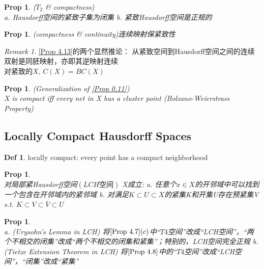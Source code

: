 \documentclass[hidelinks]{article}
\theoremstyle{definition}
\newtheorem*{defin}{Def}
\theoremstyle{plain}
\newtheorem{proposition}[theorem]{Prop}
\theoremstyle{remark}
\newtheorem*{remark}{Remark}
\begin{document}
\begin{proposition}($T_2$ \& compactness)~\\
a. Hausdorff空间的紧致子集为闭集\newline
b. 紧致Hausdorff空间是正规的
\end{proposition}

\begin{proposition}(compactness \& continuity)\label{Prop 4.13}
连续映射保紧致性
\end{proposition}

\begin{remark}
\autoref{Prop 4.13}的两个显然推论：\newline
\indent 从紧致空间到Hausdorff空间之间的连续双射是同胚映射，亦即其逆映射连续 \\
\indent 对紧致的$X$, $C(X)=BC(X)$
\end{remark}

\begin{proposition} (Generalization of \autoref{Prop 0.11})~\\
X is compact iff every net in X has a cluster point (Bolzano-Weierstrass Property)
\end{proposition}



\subsection{Locally Compact Hausdorff Spaces}
\begin{defin}
locally compact: every point has a compact neighborhood
\end{defin}

\begin{proposition}~\\
对局部紧Hausdorff空间$(LCH\textrm{空间})$ X成立:\newline
a. 任意个$x\in X$的开邻域中可以找到一个包含在开邻域内的紧邻域 \newline
b. 对满足$K\subset U\subset X$的紧集K和开集U存在预紧集V s.t. $K\subset V\subset \overline{V} \subset U$
\end{proposition}

\begin{proposition}~\\
a. (Urysohn's Lemma in LCH) 将$\autoref{Prop 4.7} (c)$中“$T4$空间”改成“LCH空间”，“两个不相交的闭集”改成“两个不相交的闭集和紧集”；特别的，LCH空间完全正规\newline
b. (Tietze Extension Theorem in LCH) 将$\autoref{Prop 4.8}$中的“$T4$空间”改成“LCH空间”，“闭集”改成“紧集”
\end{proposition}
\end{document}
